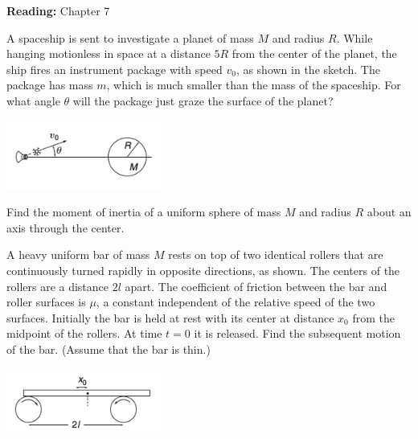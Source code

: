 \documentclass[12pt,letterpaper]{hmcpset}
\begin{document}

\textbf{Reading:} Chapter 7

\begin{problem}
    A spaceship is sent to investigate a planet of
    mass $M$ and radius $R$. While hanging motionless
    in space at a distance $5R$ from the center of
    the planet, the ship fires an instrument package
    with speed $v_{0}$, as shown in the sketch. The
    package has mass $m$, which is much smaller than
    the mass of the spaceship. For what angle $\theta$
    will the package just graze the surface of the planet?

    \begin{center}
    \includegraphics[width=2in]{img/7_4}
    \end{center}
\end{problem}

\begin{solution}
    \vfill
\end{solution}
\clearpage

\begin{problem}
    Find the moment of inertia of a uniform 
    sphere of mass $M$ and radius $R$ about
    an axis through the center.
\end{problem}

\begin{solution}
    \vfill
\end{solution}
\clearpage

\begin{problem}
    A heavy uniform bar of mass $M$ rests on top 
    of two identical rollers that are continuously
    turned rapidly in opposite directions, as shown. 
    The centers of the rollers are a distance $2l$
    apart. The coefficient of friction between the
    bar and roller surfaces is $\mu$, a constant
    independent of the relative speed of the two
    surfaces. Initially the bar is held at rest with
    its center at distance $x_{0}$ from the midpoint
    of the rollers. At time $t = 0$ it is released. 
    Find the subsequent motion of the bar. 
    (Assume that the bar is thin.)
    \begin{center}
        \includegraphics[width=2in]{img/7_9}
    \end{center}
\end{problem}
\end{document}
